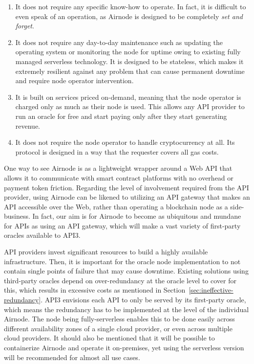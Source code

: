 \documentclass[11pt]{article}
\begin{document}
\begin{enumerate}
    \item It does not require any specific know-how to operate.
    In fact, it is difficult to even speak of an operation, as Airnode is designed to be completely \textit{set and forget}.
    \item It does not require any day-to-day maintenance such as updating the operating system or monitoring the node for uptime owing to existing fully managed serverless technology.
    It is designed to be stateless, which makes it extremely resilient against any problem that can cause permanent downtime and require node operator intervention.
    \item It is built on services priced on-demand, meaning that the node operator is charged only as much as their node is used.
    This allows any API provider to run an oracle for free and start paying only after they start generating revenue.
    \item It does not require the node operator to handle cryptocurrency at all.
    Its protocol is designed in a way that the requester covers all gas costs.
\end{enumerate}

One way to see Airnode is as a lightweight wrapper around a Web API that allows it to communicate with smart contract platforms with no overhead or payment token friction.
Regarding the level of involvement required from the API provider, using Airnode can be likened to utilizing an API gateway that makes an API accessible over the Web, rather than operating a blockchain node as a side-business.
In fact, our aim is for Airnode to become as ubiquitous and mundane for APIs as using an API gateway, which will make a vast variety of first-party oracles available to API3.

API providers invest significant resources to build a highly available infrastructure.
Then, it is important for the oracle node implementation to not contain single points of failure that may cause downtime.
Existing solutions using third-party oracles depend on over-redundancy at the oracle level to cover for this, which results in excessive costs as mentioned in Section~\ref{sec:ineffective-redundancy}.
API3 envisions each API to only be served by its first-party oracle, which means the redundancy has to be implemented at the level of the individual Airnode.
The node being fully-serverless enables this to be done easily across different availability zones of a single cloud provider, or even across multiple cloud providers.
It should also be mentioned that it will be possible to containerize Airnode and operate it on-premises, yet using the serverless version will be recommended for almost all use cases.
\end{document}
